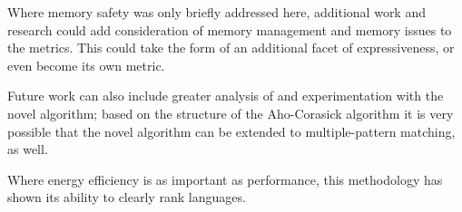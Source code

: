 Where memory safety was only briefly addressed here, additional work and research could add consideration of memory management and memory issues to the metrics. This could take the form of an additional facet of expressiveness, or even become its own metric.

Future work can also include greater analysis of and experimentation with the novel algorithm; based on the structure of the Aho-Corasick algorithm it is very possible that the novel algorithm can be extended to multiple-pattern matching, as well.

Where energy efficiency is as important as performance, this methodology has shown its ability to clearly rank languages.
